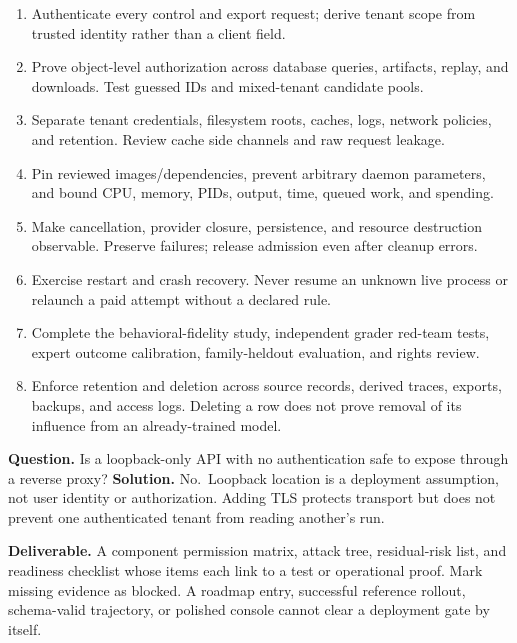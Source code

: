 \documentclass[
  11pt,
  letterpaper,
]{article}
\providecommand{\tightlist}{%
  \setlength{\itemsep}{0pt}\setlength{\parskip}{0pt}}
\begin{document}
\begin{enumerate}
\def\labelenumi{\arabic{enumi}.}
\tightlist
\item
  Authenticate every control and export request; derive tenant scope
  from trusted identity rather than a client field.
\item
  Prove object-level authorization across database queries, artifacts,
  replay, and downloads. Test guessed IDs and mixed-tenant candidate
  pools.
\item
  Separate tenant credentials, filesystem roots, caches, logs, network
  policies, and retention. Review cache side channels and raw request
  leakage.
\item
  Pin reviewed images/dependencies, prevent arbitrary daemon parameters,
  and bound CPU, memory, PIDs, output, time, queued work, and spending.
\item
  Make cancellation, provider closure, persistence, and resource
  destruction observable. Preserve failures; release admission even
  after cleanup errors.
\item
  Exercise restart and crash recovery. Never resume an unknown live
  process or relaunch a paid attempt without a declared rule.
\item
  Complete the behavioral-fidelity study, independent grader red-team
  tests, expert outcome calibration, family-heldout evaluation, and
  rights review.
\item
  Enforce retention and deletion across source records, derived traces,
  exports, backups, and access logs. Deleting a row does not prove
  removal of its influence from an already-trained model.
\end{enumerate}

\textbf{Question.} Is a loopback-only API with no authentication safe to
expose through a reverse proxy? \textbf{Solution.} No.~Loopback location
is a deployment assumption, not user identity or authorization. Adding
TLS protects transport but does not prevent one authenticated tenant
from reading another's run.

\textbf{Deliverable.} A component permission matrix, attack tree,
residual-risk list, and readiness checklist whose items each link to a
test or operational proof. Mark missing evidence as blocked. A roadmap
entry, successful reference rollout, schema-valid trajectory, or
polished console cannot clear a deployment gate by itself.
\end{document}
